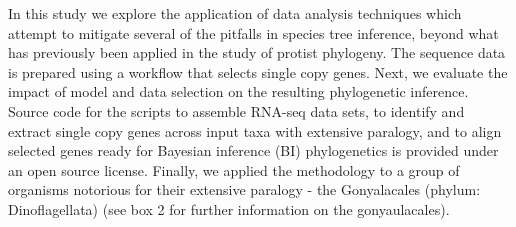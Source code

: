 \documentclass[12pt]{article}
\begin{document}
In this study we explore the application of data analysis techniques which attempt to mitigate several of the pitfalls in species tree inference, beyond what has previously been applied in the study of protist phylogeny.
The sequence data is prepared using a workflow that selects single copy genes. 
Next, we evaluate the impact of model and data selection on the resulting phylogenetic inference. 
Source code for the scripts to assemble RNA-seq data sets, to identify and extract single copy genes across input taxa with extensive paralogy, and to align selected genes ready for Bayesian inference (BI) phylogenetics is provided under an open source license. 
Finally, we applied the methodology to a group of organisms notorious for their extensive paralogy - the Gonyalacales (phylum: Dinoflagellata) (see box 2 for further information on the gonyaulacales).


\end{document}

